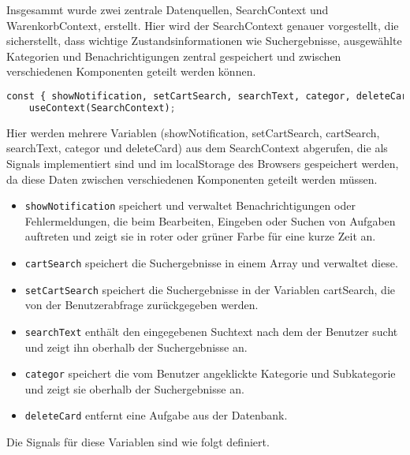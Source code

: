 Insgesammt wurde zwei zentrale Datenquellen, SearchContext und WarenkorbContext, erstellt. Hier wird der SearchContext genauer vorgestellt, die sicherstellt, dass wichtige Zustandsinformationen wie Suchergebnisse, ausgewählte Kategorien und Benachrichtigungen zentral gespeichert und zwischen verschiedenen Komponenten geteilt werden können. 


\begin{lstlisting}[language=Python]
  const { showNotification, setCartSearch, searchText, categor, deleteCard } =
    useContext(SearchContext);
 \end{lstlisting}  
 
Hier werden mehrere Variablen (showNotification, setCartSearch, cartSearch, searchText, categor und deleteCard) aus dem SearchContext abgerufen, die als Signals implementiert sind und im localStorage des Browsers gespeichert werden, da diese Daten zwischen verschiedenen Komponenten geteilt werden müssen.

\begin{itemize}
  \item \texttt{showNotification} speichert und verwaltet Benachrichtigungen oder Fehlermeldungen, die beim Bearbeiten, Eingeben oder Suchen von Aufgaben auftreten und zeigt sie in roter oder grüner Farbe für eine kurze Zeit an.
  \item \texttt{cartSearch} speichert die Suchergebnisse in einem Array und verwaltet diese.
    \item \texttt{setCartSearch} speichert die Suchergebnisse in der Variablen cartSearch, die von der Benutzerabfrage zurückgegeben werden.
    \item \texttt{searchText} enthält den eingegebenen Suchtext nach dem der Benutzer sucht und zeigt ihn oberhalb der Suchergebnisse an.
    \item \texttt{categor} speichert die vom Benutzer angeklickte Kategorie und Subkategorie und zeigt sie oberhalb der Suchergebnisse an.
    \item \texttt{deleteCard} entfernt eine Aufgabe aus der Datenbank.
  
\end{itemize}

Die Signals für diese Variablen sind wie folgt definiert.
    

